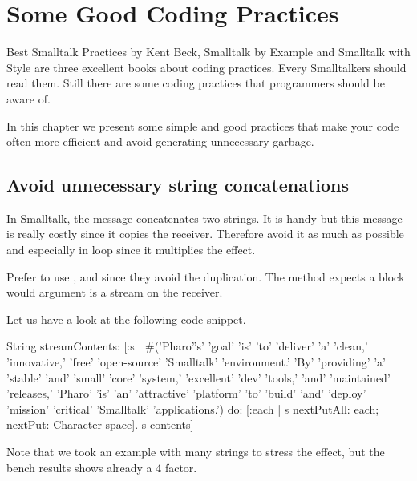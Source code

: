 \documentclass[a4paper,10pt,twoside]{book}
\begin{document}
	\sloppy
\fi



\chapter{Some Good Coding Practices}

Best Smalltalk Practices by Kent Beck, Smalltalk by Example and Smalltalk with Style are three excellent books about coding practices.  Every Smalltalkers should read them. Still there are some coding practices that programmers should be aware of.

In this chapter we present some simple and good practices that make your code often more efficient and 
avoid generating unnecessary garbage. 

\section{Avoid unnecessary string concatenations}

In Smalltalk, the message \ct{,}  concatenates two strings. It is handy but this message is really costly since it copies the receiver. Therefore avoid it as much as possible and especially in loop since it multiplies the effect. 

Prefer to use  ,  and  since they avoid the duplication. The method  expects a block would argument is a stream on the receiver. 

Let us have a look at the following code snippet. 
\begin{code}{}
String streamContents: [:s |
 #('Pharo''s' 'goal' 'is' 'to' 'deliver' 'a' 'clean,' 'innovative,' 'free' 'open-source' 'Smalltalk' 'environment.' 'By' 'providing' 'a' 'stable' 'and' 'small' 'core' 'system,' 'excellent' 'dev' 'tools,' 'and' 'maintained' 'releases,' 'Pharo' 'is' 'an' 'attractive' 'platform' 'to' 'build' 'and' 'deploy' 'mission' 'critical' 'Smalltalk' 'applications.')
 	do: [:each | s nextPutAll: each; nextPut: Character space].
	s contents] 
\end{code}

Note that we took an example with many strings to stress the effect, but the bench results shows already a 4 factor. 
\end{document}
